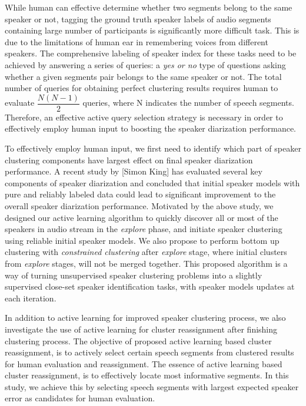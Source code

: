 \documentclass[journal]{IEEEtran}
\begin{document}
While human can effective determine whether two segments belong to the same speaker or not, tagging the ground truth speaker labels of audio segments containing large number of participants is significantly more difficult task. This is due to the limitations of human ear in remembering voices from different speakers. The comprehensive labeling of speaker index for these tasks need to be achieved by answering a series of queries: a \textit{yes or no} type of questions asking whether a given segments pair belongs to the same speaker or not. The total number of queries for obtaining perfect clustering results requires human to evaluate $\dfrac{N(N-1)}{2}$ queries, where N indicates the number of speech segments. Therefore, an effective active query selection strategy is necessary in order to effectively employ human input to boosting the speaker diarization performance. 

To effectively employ human input, we first need to identify which part of speaker clustering components have largest effect on final speaker diarization performance. A recent study by [Simon King] has evaluated several key components of speaker diarization and concluded that initial speaker models with pure and reliably labeled data could lead to significant improvement to the overall speaker diarization performance.  Motivated by the above study, we designed our active learning algorithm to quickly discover all or most of the speakers in audio stream in the \textit{explore} phase, and initiate speaker clustering using reliable initial speaker models. We also propose to perform bottom up clustering with \textit{constrained clustering} after \textit{explore} stage, where initial clusters from \textit{explore} stages, will not be merged together. This proposed algorithm is a way of turning unsupervised speaker clustering problems into a slightly supervised close-set speaker identification tasks, with speaker models updates at each iteration.

In addition to active learning for improved speaker clustering process, we also investigate the use of active learning for cluster reassignment after finishing clustering process. The objective of proposed active learning based cluster reassignment, is to actively select certain speech segments from clustered results for human evaluation and reassignment. The essence of active learning based cluster reassignment, is to effectively locate most informative segments. In this study, we achieve this by selecting speech segments with largest expected speaker error as candidates for human evaluation.
\end{document}
